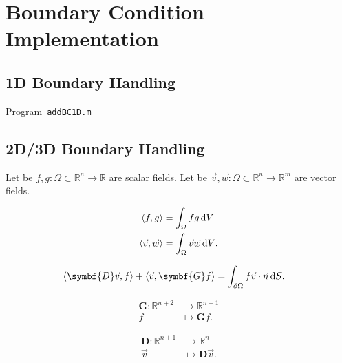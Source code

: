 \section{Boundary Condition Implementation}

\subsection{1D Boundary Handling}

\begin{listing}[ht!]
	\tiny
	\centering
	\caption{Program~\texttt{addBC1D.m}}
	\label{code:addBC1D.m}
\end{listing}

\subsection{2D/3D Boundary Handling}

Let be
\begin{math}
	f,g\colon\Omega\subset\mathbb{R}^{n}\to
	\mathbb{R}
\end{math}
are scalar fields.
Let be
\begin{math}
	\vec{v},\vec{w}\colon\Omega\subset\mathbb{R}^{n}\to
	\mathbb{R}^{m}
\end{math}
are vector fields.

\begin{align*}
	\left\langle
	f,g
	\right\rangle & =
	\int_{\Omega}fg \dl V. \\
	\left\langle
	\vec{v},\vec{w}
	\right\rangle & =
	\int_{\Omega}\vec{v}\vec{w}\dl V.
\end{align*}

\begin{align*}
	\left\langle
	\symbf{D}\vec{v},
	f
	\right\rangle+
	\left\langle
	\vec{v},
	\symbf{G}f
	\right\rangle & =
	\int_{\partial\Omega}
	f\vec{v}\cdot\vec{n}\dl S.
\end{align*}

\begin{align*}
	\symbf{G}\colon\mathbb{R}^{n+2} & \longrightarrow
	\mathbb{R}^{n+1}                                  \\
	f                               & \longmapsto
	\symbf{G}f.
\end{align*}

\begin{align*}
	\symbf{D}\colon\mathbb{R}^{n+1} & \longrightarrow
	\mathbb{R}^{n}                                    \\
	\vec{v}                         & \longmapsto
	\symbf{D}\vec{v}.
\end{align*}

